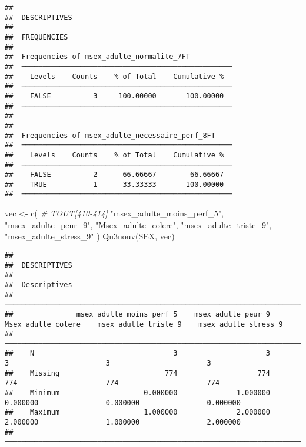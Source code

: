 \documentclass[
]{article}
\newenvironment{Shaded}{\begin{snugshade}}{\end{snugshade}}
\newcommand{\CommentTok}[1]{\textcolor[rgb]{0.56,0.35,0.01}{\textit{#1}}}
\newcommand{\FunctionTok}[1]{\textcolor[rgb]{0.00,0.00,0.00}{#1}}
\newcommand{\NormalTok}[1]{#1}
\newcommand{\OtherTok}[1]{\textcolor[rgb]{0.56,0.35,0.01}{#1}}
\newcommand{\StringTok}[1]{\textcolor[rgb]{0.31,0.60,0.02}{#1}}
\begin{document}
\begin{verbatim}
## 
##  DESCRIPTIVES
## 
##  FREQUENCIES
## 
##  Frequencies of msex_adulte_normalite_7FT           
##  ────────────────────────────────────────────────── 
##    Levels    Counts    % of Total    Cumulative %   
##  ────────────────────────────────────────────────── 
##    FALSE          3     100.00000       100.00000   
##  ────────────────────────────────────────────────── 
## 
## 
##  Frequencies of msex_adulte_necessaire_perf_8FT     
##  ────────────────────────────────────────────────── 
##    Levels    Counts    % of Total    Cumulative %   
##  ────────────────────────────────────────────────── 
##    FALSE          2      66.66667        66.66667   
##    TRUE           1      33.33333       100.00000   
##  ──────────────────────────────────────────────────
\end{verbatim}

\begin{Shaded}
\begin{Highlighting}[]
\NormalTok{vec }\OtherTok{\textless{}{-}} \FunctionTok{c}\NormalTok{(  }\CommentTok{\# TOUT[410{-}414]}
  \StringTok{"msex\_adulte\_moins\_perf\_5"}\NormalTok{,}
  \StringTok{"msex\_adulte\_peur\_9"}\NormalTok{,}
  \StringTok{"Msex\_adulte\_colere"}\NormalTok{,}
  \StringTok{"msex\_adulte\_triste\_9"}\NormalTok{,}
  \StringTok{"msex\_adulte\_stress\_9"}
\NormalTok{  )}
\FunctionTok{Qu3nouv}\NormalTok{(SEX, vec)}
\end{Highlighting}
\end{Shaded}

\begin{verbatim}
## 
##  DESCRIPTIVES
## 
##  Descriptives                                                                                                                        
##  ─────────────────────────────────────────────────────────────────────────────────────────────────────────────────────────────────── 
##               msex_adulte_moins_perf_5    msex_adulte_peur_9    Msex_adulte_colere    msex_adulte_triste_9    msex_adulte_stress_9   
##  ─────────────────────────────────────────────────────────────────────────────────────────────────────────────────────────────────── 
##    N                                 3                     3                     3                       3                       3   
##    Missing                         774                   774                   774                     774                     774   
##    Minimum                    0.000000              1.000000              0.000000                0.000000                0.000000   
##    Maximum                    1.000000              2.000000              2.000000                1.000000                2.000000   
##  ───────────────────────────────────────────────────────────────────────────────────────────────────────────────────────────────────
\end{verbatim}
\end{document}
